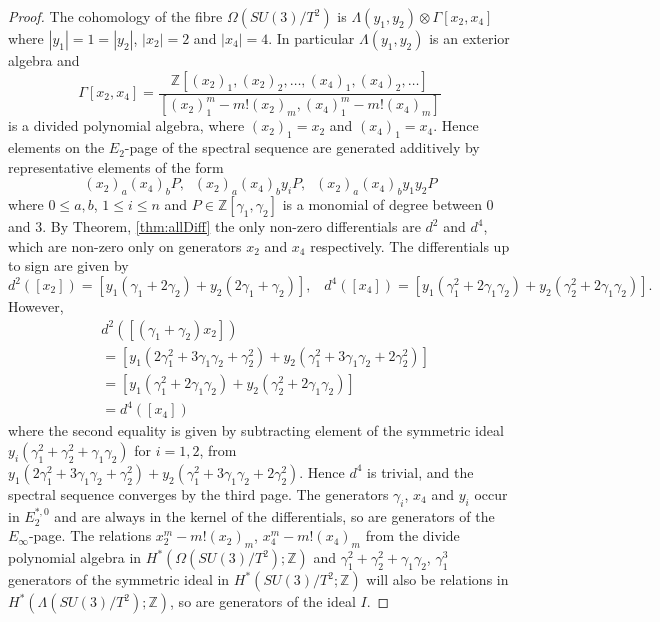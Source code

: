\documentclass{article}
\theoremstyle{plain}
\theoremstyle{definition}
\numberwithin{thm}{section}
\begin{document}
\begin{proof}
				The cohomology of the fibre $\Omega(SU(3)/T^2)$ is $\Lambda(y_1,y_2)\otimes\Gamma[x_2,x_4]$
				where $|y_1|=1=|y_2|$, $|x_2|=2$ and $|x_4|=4$.
				In particular $\Lambda(y_1,y_2)$ is an exterior algebra
				and 
				\begin{equation*}
					\Gamma[x_2,x_4]=\frac{\mathbb{Z}[(x_2)_1,(x_2)_2,\dots,(x_4)_1,(x_4)_2,\dots]}{[(x_2)_1^m-m!(x_2)_m, (x_4)_1^m-m!(x_4)_m]}
				\end{equation*}
				is a divided polynomial algebra, where $(x_2)_1=x_2$ and $(x_4)_1=x_4$.
				Hence elements on the $E_2$-page of the spectral sequence are generated additively by representative elements
				of the form
				\begin{equation*}
					(x_2)_a(x_4)_bP, \;\; (x_2)_a(x_4)_by_iP, \;\; (x_2)_a(x_4)_by_1y_2P
				\end{equation*}
				where $0\leq a,b$, $1\leq i \leq n$ and $P\in \mathbb{Z}[\gamma_1,\gamma_2]$ is a monomial of degree between $0$ and $3$.
				By Theorem, \ref{thm:allDiff} the only non-zero differentials are $d^2$ and $d^4$,
				which are non-zero only on generators $x_2$ and $x_4$ respectively.
				The differentials up to sign are given by
				\begin{equation*}
					d^2([x_2])=[y_1(\gamma_1+2\gamma_2)+y_2(2\gamma_1+\gamma_2)], \;\;\;
					d^4([x_4])=[y_1(\gamma_1^2+2\gamma_1\gamma_2)+y_2(\gamma_2^2+2\gamma_1\gamma_2)].
				\end{equation*}
				However, 
				\begin{align*}
					&d^2([(\gamma_1+\gamma_2)x_2]) \\
					&=[y_1(2\gamma_1^2+3\gamma_1\gamma_2+\gamma_2^2)+y_2(\gamma_1^2+3\gamma_1\gamma_2+2\gamma_2^2)] \\
					&=[y_1(\gamma_1^2+2\gamma_1\gamma_2)+y_2(\gamma_2^2+2\gamma_1\gamma_2)] \\
					&=d^4([x_4])
				\end{align*}
				where the second equality is given by subtracting element of the symmetric ideal $y_i(\gamma_1^2+\gamma_2^2+\gamma_1\gamma_2)$ for $i=1,2$, 
				from $y_1(2\gamma_1^2+3\gamma_1\gamma_2+\gamma_2^2)+y_2(\gamma_1^2+3\gamma_1\gamma_2+2\gamma_2^2)$.
				Hence $d^4$ is trivial, and the spectral sequence converges by the third page.
				The generators $\gamma_i$, $x_4$ and $y_i$ occur in $E_2^{*,0}$ and are always in the kernel of the differentials,
				so are generators of the $E_\infty$-page.
				The relations $x_2^m-m!(x_2)_m$, $x_4^m-m!(x_4)_m$ from the divide polynomial algebra in $H^*(\Omega(SU(3)/T^2);\mathbb{Z})$
				and $\gamma_1^2+\gamma_2^2+\gamma_1\gamma_2$, $\gamma_1^3$ generators of the symmetric ideal in $H^*(SU(3)/T^2;\mathbb{Z})$
				will also be relations in $H^*(\Lambda(SU(3)/T^2);\mathbb{Z})$,
				so are generators of the ideal $I$.
				

\end{proof}
\end{document}
